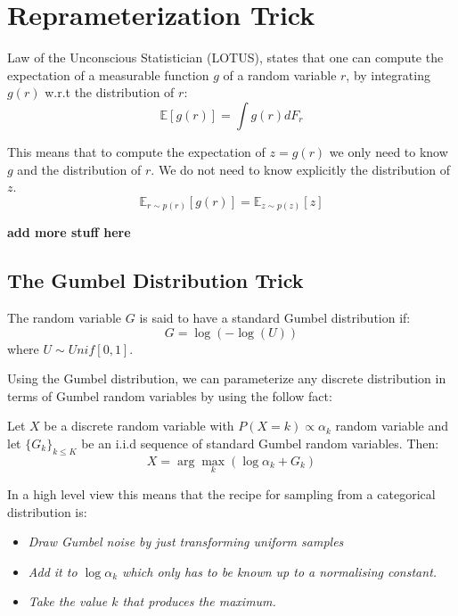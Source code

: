 \section{Reprameterization Trick}
\begin{defn} Law of the Unconscious Statistician (LOTUS), states that one can compute the expectation of a measurable function $g$ of a random variable $r$, by integrating $g(r)$ w.r.t the distribution of $r$:\begin{equation*}
	\mathbb{E}[g(r)] = \int g(r)dF_{r}
	\end{equation*}
\end{defn}

This means that to compute the expectation of $z = g(r)$ we only need to know $g$ and the distribution of $r$. We do not need to know explicitly the distribution of $z$. \begin{equation*}
\mathbb{E}_{r\sim p(r)}[g(r)] = \mathbb{E}_{z \sim p(z)}[z]
\end{equation*}

\textbf{add more stuff here}

\subsection{The Gumbel Distribution Trick}
\begin{defn} The random variable $G$ is said to have a standard Gumbel distribution  if:
	\begin{equation*}
		G = \log (-\log(U))
	\end{equation*}
where $U \sim Unif[0,1]$.
\end{defn}
Using the Gumbel distribution, we can parameterize any discrete distribution in terms of Gumbel random variables by using the follow fact:
\begin{defn}
	Let $X$ be a discrete random variable with $P(X = k) \propto \alpha_{k}$ random variable and let $\{G_{k}\}_{k \leq K}$ be an i.i.d sequence of standard Gumbel random variables. Then:\begin{equation*}
		X = \arg \underset{k}{\max} (\log \alpha_{k} + G_{k})
	\end{equation*} 
\end{defn}

In a high level view this means that the recipe for sampling from a categorical distribution is: \begin{itemize}
	\item \textit{Draw Gumbel noise by just transforming uniform samples}
	\item \textit{Add it to $\log \alpha_{k}$ which only has to be known up to a normalising constant.}
	\item \textit{Take the value $k$ that produces the maximum.}
\end{itemize}

